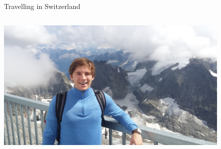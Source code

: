 \documentclass{beamer}
\begin{document}
\begin{frame}{Travelling in Switzerland}
\begin{columns}[onlytextwidth]
\begin{column}{0.5\textwidth}
  \centering
  \includegraphics[height=0.4\textheight, width=0.85\textwidth]{figures/pr4.jpg}
  \end{column}
  \end{columns}
 
\end{frame}






\end{document}

